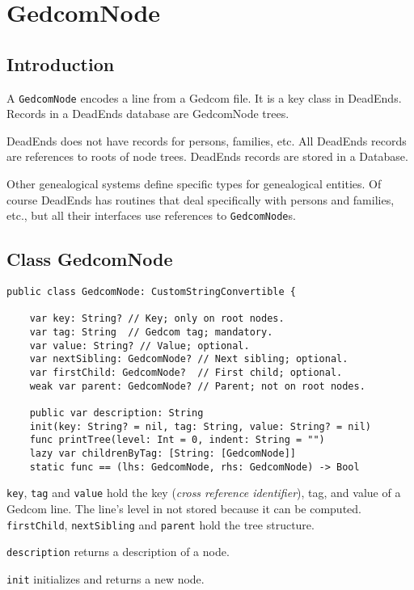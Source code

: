 \section{GedcomNode}
\subsection{Introduction}

A \texttt{GedcomNode} encodes a line from a Gedcom file.
It is a key class in DeadEnds.
Records in a
DeadEnds database are GedcomNode trees.

DeadEnds does not have records for persons, families, etc.
All DeadEnds records are references to roots of node trees.
DeadEnds records are stored in a Database.

Other genealogical systems define
specific types for genealogical entities.
Of course DeadEnds has routines that deal specifically
with persons and families, etc., 
but all their interfaces use references to \texttt{GedcomNode}s.

\subsection{Class GedcomNode}
\begin{verbatim}
public class GedcomNode: CustomStringConvertible {

    var key: String? // Key; only on root nodes.
    var tag: String  // Gedcom tag; mandatory.
    var value: String? // Value; optional.
    var nextSibling: GedcomNode? // Next sibling; optional.
    var firstChild: GedcomNode?  // First child; optional.
    weak var parent: GedcomNode? // Parent; not on root nodes.
    
    public var description: String
    init(key: String? = nil, tag: String, value: String? = nil)
    func printTree(level: Int = 0, indent: String = "")
    lazy var childrenByTag: [String: [GedcomNode]]
    static func == (lhs: GedcomNode, rhs: GedcomNode) -> Bool

\end{verbatim}
\texttt{key}, \texttt{tag} and
\texttt{value} hold the key (\emph{cross reference identifier}), tag,
and value of a Gedcom line. The line's level in not stored because it
can be computed.
\texttt{firstChild}, \texttt{nextSibling} and \texttt{parent} hold
the tree structure.

\texttt{description} returns a description of a node.

\texttt{init} initializes and returns a new node.

